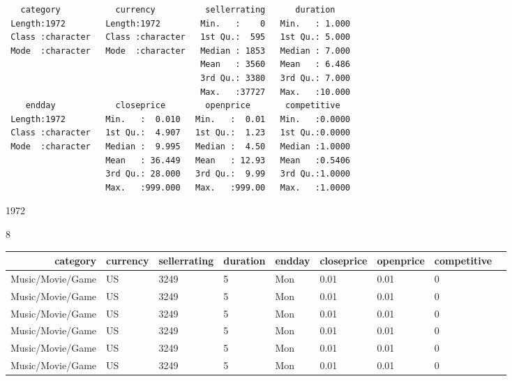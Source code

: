\documentclass[11pt]{article}
\begin{document}
    
    \begin{verbatim}
   category           currency          sellerrating      duration     
 Length:1972        Length:1972        Min.   :    0   Min.   : 1.000  
 Class :character   Class :character   1st Qu.:  595   1st Qu.: 5.000  
 Mode  :character   Mode  :character   Median : 1853   Median : 7.000  
                                       Mean   : 3560   Mean   : 6.486  
                                       3rd Qu.: 3380   3rd Qu.: 7.000  
                                       Max.   :37727   Max.   :10.000  
    endday            closeprice        openprice       competitive    
 Length:1972        Min.   :  0.010   Min.   :  0.01   Min.   :0.0000  
 Class :character   1st Qu.:  4.907   1st Qu.:  1.23   1st Qu.:0.0000  
 Mode  :character   Median :  9.995   Median :  4.50   Median :1.0000  
                    Mean   : 36.449   Mean   : 12.93   Mean   :0.5406  
                    3rd Qu.: 28.000   3rd Qu.:  9.99   3rd Qu.:1.0000  
                    Max.   :999.000   Max.   :999.00   Max.   :1.0000  
    \end{verbatim}

    
    \begin{enumerate*}
\item 1972
\item 8
\end{enumerate*}


    
    \begin{tabular}{r|llllllll}
 category & currency & sellerrating & duration & endday & closeprice & openprice & competitive\\
\hline
	 Music/Movie/Game & US               & 3249             & 5                & Mon              & 0.01             & 0.01             & 0               \\
	 Music/Movie/Game & US               & 3249             & 5                & Mon              & 0.01             & 0.01             & 0               \\
	 Music/Movie/Game & US               & 3249             & 5                & Mon              & 0.01             & 0.01             & 0               \\
	 Music/Movie/Game & US               & 3249             & 5                & Mon              & 0.01             & 0.01             & 0               \\
	 Music/Movie/Game & US               & 3249             & 5                & Mon              & 0.01             & 0.01             & 0               \\
	 Music/Movie/Game & US               & 3249             & 5                & Mon              & 0.01             & 0.01             & 0               \\
\end{tabular}
\end{document}
